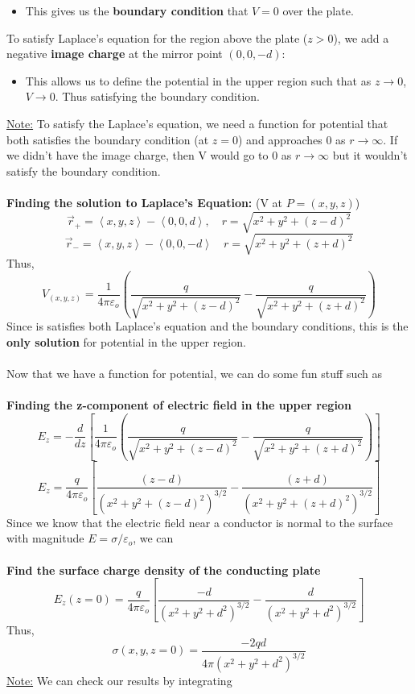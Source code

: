 \documentclass[12pt]{article}
\begin{document}
\begin{enumerate}
\begin{itemize}
    \item This gives us the \textbf{boundary condition} that $V=0$ over the plate.
\end{itemize}
To satisfy Laplace's equation for the region above the plate ($z>0$), we add a negative \textbf{image charge} at the mirror point $(0,0,-d)$:
\begin{itemize}
    \item This allows us to define the potential in the upper region such that as $z \to 0$, $V \to 0$. Thus satisfying the boundary condition.
\end{itemize}
\underline{Note:} To satisfy the Laplace's equation, we need a function for potential that both satisfies the boundary condition (at $z=0$) and approaches 0 as $r \to \infty$. If we didn't have the image charge, then V would go to 0 as $r \to \infty$ but it wouldn't satisfy the boundary condition.\\\\
\textbf{Finding the solution to Laplace's Equation:} (V at $P=(x,y,z)$)
\[\vec{r}_+ = \left<x,y,z\right>-\left<0,0,d\right>, \quad r=\sqrt{x^2+y^2+(z-d)^2}\]
\[\vec{r}_- = \left<x,y,z\right>-\left<0,0,-d\right> \quad r=\sqrt{x^2+y^2+(z+d)^2}\]
Thus,
\[\boxed{V_{(x,y,z)}=\frac{1}{4\pi\varepsilon_o}\left(\frac{q}{\sqrt{x^2+y^2+(z-d)^2}}-\frac{q}{\sqrt{x^2+y^2+(z+d)^2}}\right)}\]
Since is satisfies both Laplace's equation and the boundary conditions, this is the \textbf{only solution} for potential in the upper region.\\\\
Now that we have a function for potential, we can do some fun stuff such as\\\\
\textbf{Finding the z-component of electric field in the upper region}
\[E_z=-\frac{d}{dz}\left[\frac{1}{4\pi\varepsilon_o}\left(\frac{q}{\sqrt{x^2+y^2+(z-d)^2}}-\frac{q}{\sqrt{x^2+y^2+(z+d)^2}}\right)\right]\]
\[E_z = \frac{q}{4\pi\varepsilon_o}\left[\frac{(z-d)}{(x^2 + y^2 + (z-d)^2)^{3/2}}
- \frac{(z+d)}{(x^2 + y^2 + (z+d)^2)^{3/2}}\right]\]
Since we know that the electric field near a conductor is normal to the surface with magnitude $E=\sigma/\varepsilon_o$, we can \\\\
\textbf{Find the surface charge density of the conducting plate}
\[E_z(z=0)=\frac{q}{4\pi\varepsilon_o}\left[\frac{-d}{(x^2 + y^2 + d^2)^{3/2}}
- \frac{d}{(x^2 + y^2 + d^2)^{3/2}}\right]\]
Thus,
\[\sigma(x,y,z=0)=\frac{-2qd}{4\pi(x^2+y^2+d^2)^{3/2}}\]
\underline{Note:} We can check our results by integrating

\end{enumerate}
\end{document}
